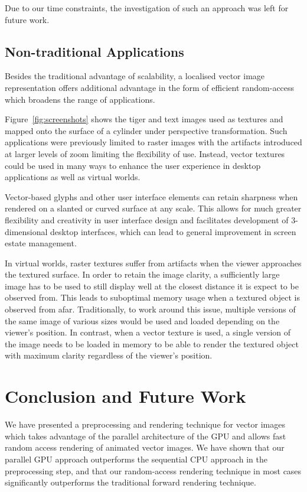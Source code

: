 \documentclass[11pt,a4paper,twoside]{article}
\begin{document}
Due to our time constraints, the investigation of such an approach was left for future work.

\subsection {Non-traditional Applications}

Besides the traditional advantage of scalability, a localised vector image representation offers additional advantage in the form of efficient random-access which broadens the range of applications.

Figure~\ref{fig:screenshots} shows the tiger and text images used as textures and mapped onto the surface of a cylinder under perspective transformation. Such applications were previously limited to raster images with the artifacts introduced at larger levels of zoom limiting the flexibility of use. Instead, vector textures could be used in many ways to enhance the user experience in desktop applications as well as virtual worlds.

Vector-based glyphs and other user interface elements can retain sharpness when rendered on a slanted or curved surface at any scale. This allows for much greater flexibility and creativity in user interface design and facilitates development of 3-dimensional desktop interfaces, which can lead to general improvement in screen estate management.

In virtual worlds, raster textures suffer from artifacts when the viewer approaches the textured surface. In order to retain the image clarity, a sufficiently large image has to be used to still display well at the closest distance it is expect to be observed from. This leads to suboptimal memory usage when a textured object is observed from afar. Traditionally, to work around this issue, multiple versions of the same image of various sizes would be used and loaded depending on the viewer's position. In contrast, when a vector texture is used, a single version of the image needs to be loaded in memory to be able to render the textured object with maximum clarity regardless of the viewer's position.

\section {Conclusion and Future Work}

We have presented a preprocessing and rendering technique for vector images which takes advantage of the parallel architecture of the GPU and allows fast random access rendering of animated vector images. We have shown that our parallel GPU approach outperforms the sequential CPU approach in the preprocessing step, and that our random-access rendering technique in most cases significantly outperforms the traditional forward rendering technique.
\end{document}
